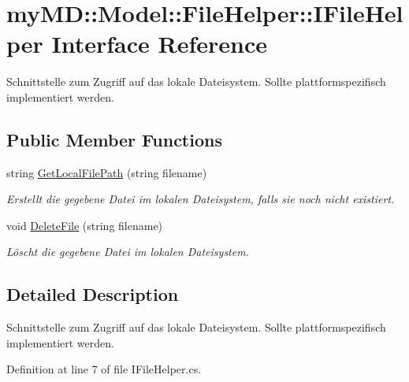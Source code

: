 \hypertarget{interfacemy_m_d_1_1_model_1_1_file_helper_1_1_i_file_helper}{
\section{my\-MD::Model::File\-Helper::IFile\-Helper Interface Reference}
\label{df/df8/interfacemy_m_d_1_1_model_1_1_file_helper_1_1_i_file_helper}
}
Schnittstelle zum Zugriff auf das lokale Dateisystem. Sollte plattformspezifisch implementiert werden.  


\subsection*{Public Member Functions}
\begin{CompactItemize}
\item 
string \hyperlink{interfacemy_m_d_1_1_model_1_1_file_helper_1_1_i_file_helper_aa22e4a15c7b3284942b2a4ad797369c}{Get\-Local\-File\-Path} (string filename)
\begin{CompactList}\small\item\em Erstellt die gegebene Datei im lokalen Dateisystem, falls sie noch nicht existiert. \item\end{CompactList}\item 
void \hyperlink{interfacemy_m_d_1_1_model_1_1_file_helper_1_1_i_file_helper_ff873363eee7227752f2450cb176f009}{Delete\-File} (string filename)
\begin{CompactList}\small\item\em L\"{o}scht die gegebene Datei im lokalen Dateisystem. \item\end{CompactList}\end{CompactItemize}


\subsection{Detailed Description}
Schnittstelle zum Zugriff auf das lokale Dateisystem. Sollte plattformspezifisch implementiert werden. 



Definition at line 7 of file IFile\-Helper.cs.

